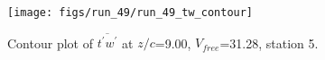 \begin{figure}[H]
\centering
\texttt{[image: figs/run\_49/run\_49\_tw\_contour]}
\caption{Contour plot of $\overline{t^\prime w^\prime}$ at $z/c$=9.00, $V_{free}$=31.28, station 5.}
\end{figure}


